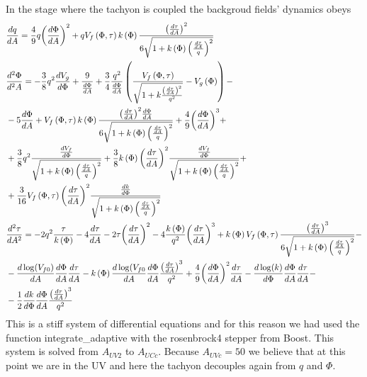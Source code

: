 \documentclass[a4paper,12pt]{article}
\begin{document}
In the stage where the tachyon is coupled the backgroud fields' dynamics obeys
\begin{align}
& \frac{dq}{dA} = \frac{4}{9} q {\left(\frac{d\Phi}{dA}\right)}^2 + q V_f \left(\Phi, \tau\right) k\left(\Phi\right) \frac{{\left(\frac{d\tau}{dA}\right)}^2}{6\sqrt{1+ k\left(\Phi\right) {\left(\frac{\frac{d\tau}{dA}}{q}\right)}^2}} \\
& \frac{d^2 \Phi}{d^2A} = - \frac{3}{8} q^2 \frac{d V_g}{d\Phi} + \frac{9}{\frac{d\Phi}{dA}} + \frac{3}{4} \frac{q^2}{\frac{d\Phi}{dA}} \left( \frac{V_f \left(\Phi, \tau\right)}{\sqrt{1+ k \frac{{\left(\frac{d\tau}{dA}\right)}^2}{q^2}}} - V_g \left(\Phi\right) \right) - \\ \notag
& - 5 \frac{d\Phi}{d A} + V_f \left(\Phi, \tau\right) k \left(\Phi\right) \frac{{\left(\frac{d\tau}{dA}\right)}^2 \frac{d\Phi}{dA}}{6 \sqrt{1+ k\left(\Phi\right) {\left(\frac{\frac{d\tau}{dA}}{q}\right)}^2 }} + \frac{4}{9} {\left(\frac{d\Phi}{dA}\right)}^3 + \\ \notag
& + \frac{3}{8} q^2 \frac{\frac{d V_f}{d\Phi}}{\sqrt{1+ k\left(\Phi\right) {\left(\frac{\frac{d\tau}{dA}}{q}\right)}^2}} + \frac{3}{8} k\left(\Phi\right) {\left( \frac{d\tau}{dA}\right)}^2 \frac{\frac{dV_f}{d\Phi}}{\sqrt{1+ k\left(\Phi\right) {\left(\frac{\frac{d\tau}{dA}}{q}\right)}^2}} + \\ \notag
& + \frac{3}{16} V_f\left(\Phi, \tau\right) {\left( \frac{d\tau}{dA}\right)}^2 \frac{\frac{dk}{d \Phi}}{\sqrt{1+ k\left(\Phi\right) {\left(\frac{\frac{d\tau}{dA}}{q}\right)}^2}} \\ \notag
& \frac{d^2 \tau}{d A^2} = -2 q^2 \frac{\tau}{k\left(\Phi\right)} - 4 \frac{d\tau}{d A} -2 \tau {\left(\frac{d\tau}{dA}\right)}^2 - 4\frac{k\left(\Phi\right)}{q^2} {\left(\frac{d\tau}{dA}\right)}^3 + k\left(\Phi\right) V_f \left(\Phi, \tau \right) \frac{{\left(\frac{d\tau}{dA}\right)}^3}{6 \sqrt{1+ k\left(\Phi\right) {\left(\frac{\frac{d\tau}{dA}}{q}\right)}^2}} - \\
& - \frac{d \log(V_{f0})}{dA} \frac{d\Phi}{dA} \frac{d\tau}{dA} - k \left(\Phi\right) \frac{d\log(V_{f0}}{dA} \frac{d\Phi}{dA}\frac{{\left(\frac{d\tau}{d A}\right)}^3}{q^2} + \frac{4}{9} {\left(\frac{d\Phi}{dA}\right)}^2 \frac{d\tau}{dA} - \frac{d \log(k)}{d\Phi} \frac{d\Phi}{dA} \frac{d\tau}{dA} - \\ \notag
& - \frac{1}{2} \frac{d k}{d\Phi} \frac{d\Phi}{dA} \frac{{\left( \frac{d\tau}{dA}\right)}^3}{q^2}
\end{align}
This is a stiff system of differential equations and for this reason we had used the function integrate\_adaptive with the rosenbrock4 stepper from Boost. This system is solved from $A_{UV2}$ to $A_{UCc}$. Because $A_{UVc} = 50$ we believe that at this point we are in the UV and here the tachyon decouples again from $q$ and $\Phi$.
\end{document}

